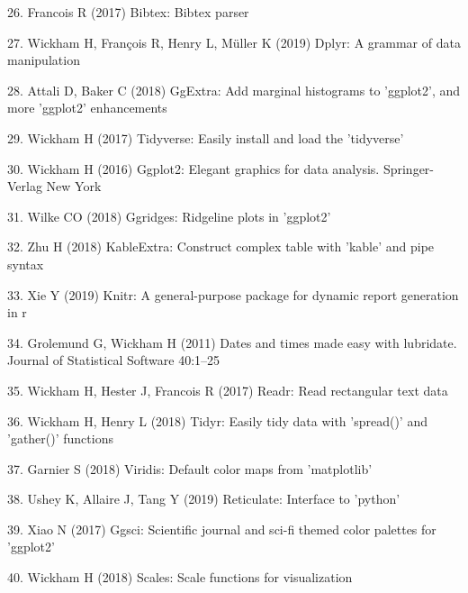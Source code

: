 \documentclass[11pt,]{article}
\begin{document}
\leavevmode\hypertarget{ref-bibtex}{}%
26. Francois R (2017) Bibtex: Bibtex parser

\leavevmode\hypertarget{ref-dplyr}{}%
27. Wickham H, François R, Henry L, Müller K (2019) Dplyr: A grammar of
data manipulation

\leavevmode\hypertarget{ref-ggExtra}{}%
28. Attali D, Baker C (2018) GgExtra: Add marginal histograms to
'ggplot2', and more 'ggplot2' enhancements

\leavevmode\hypertarget{ref-tidyverse}{}%
29. Wickham H (2017) Tidyverse: Easily install and load the 'tidyverse'

\leavevmode\hypertarget{ref-ggplot2}{}%
30. Wickham H (2016) Ggplot2: Elegant graphics for data analysis.
Springer-Verlag New York

\leavevmode\hypertarget{ref-ggridges}{}%
31. Wilke CO (2018) Ggridges: Ridgeline plots in 'ggplot2'

\leavevmode\hypertarget{ref-kableExtra}{}%
32. Zhu H (2018) KableExtra: Construct complex table with 'kable' and
pipe syntax

\leavevmode\hypertarget{ref-knitr1}{}%
33. Xie Y (2019) Knitr: A general-purpose package for dynamic report
generation in r

\leavevmode\hypertarget{ref-lubridate}{}%
34. Grolemund G, Wickham H (2011) Dates and times made easy with
lubridate. Journal of Statistical Software 40:1--25

\leavevmode\hypertarget{ref-readr}{}%
35. Wickham H, Hester J, Francois R (2017) Readr: Read rectangular text
data

\leavevmode\hypertarget{ref-tidyr}{}%
36. Wickham H, Henry L (2018) Tidyr: Easily tidy data with 'spread()'
and 'gather()' functions

\leavevmode\hypertarget{ref-viridis}{}%
37. Garnier S (2018) Viridis: Default color maps from 'matplotlib'

\leavevmode\hypertarget{ref-reticulate}{}%
38. Ushey K, Allaire J, Tang Y (2019) Reticulate: Interface to 'python'

\leavevmode\hypertarget{ref-ggsci}{}%
39. Xiao N (2017) Ggsci: Scientific journal and sci-fi themed color
palettes for 'ggplot2'

\leavevmode\hypertarget{ref-scales}{}%
40. Wickham H (2018) Scales: Scale functions for visualization
\end{document}

